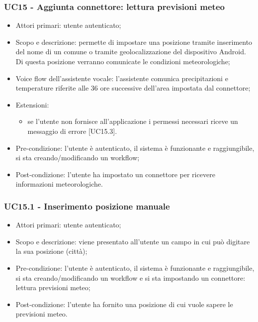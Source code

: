 \subsubsection{UC15 - Aggiunta connettore: lettura previsioni meteo}
\begin{itemize}
	\item  Attori primari: utente autenticato;
	\item  Scopo e descrizione: permette di impostare una posizione tramite inserimento del nome di un comune o tramite geolocalizzazione del dispositivo Android. Di questa posizione verranno comunicate le condizioni meteorologiche;
	\item  Voice flow dell'assistente vocale: l'assistente comunica precipitazioni e temperature riferite alle 36 ore successive dell'area impostata dal connettore;
	\item  Estensioni: 
		   \begin{itemize}
				\item se l'utente non fornisce all'applicazione i permessi necessari riceve un messaggio di errore [UC15.3].
		   \end{itemize}
	\item  Pre-condizione: l'utente è autenticato, il sistema è funzionante e raggiungibile, si sta creando/modificando un workflow;
	\item  Post-condizione: l'utente ha impostato un connettore per ricevere informazioni meteorologiche.
\end{itemize}
\subsubsection{UC15.1 - Inserimento posizione manuale}
\begin{itemize}
	\item  Attori primari: utente autenticato;
	\item  Scopo e descrizione: viene presentato all'utente un campo in cui può digitare la sua posizione (città);
	\item  Pre-condizione: l'utente è autenticato, il sistema è funzionante e raggiungibile, si sta creando/modificando un workflow e si sta impostando un connettore: lettura previsioni meteo;
	\item  Post-condizione: l'utente ha fornito una posizione di cui vuole sapere le previsioni meteo.
\end{itemize}
